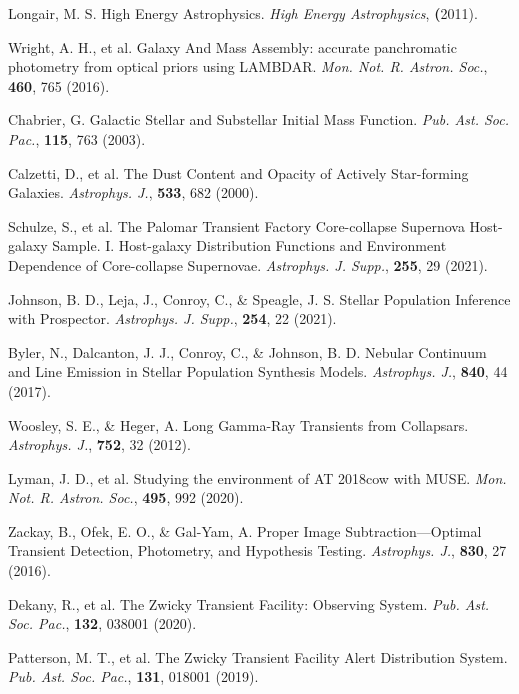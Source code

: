 \documentclass{nature_plusfigure}
\newcommand{\mn}{{Mon. Not. R. Astron. Soc.}}
\newcommand{\mnras}{\mn}
\newcommand{\apj}{{Astrophys. J.}}
\newcommand{\apjs}{{Astrophys. J. Supp.}}
\newcommand{\pasp}{{Pub. Ast. Soc. Pac.}}
\begin{document}
\begin{methods}
\begin{thebibliography}{10}
  Longair, M. S. High Energy Astrophysics. \emph{High Energy Astrophysics}, \textbf (2011). 
 
 
  Wright, A. H., et al. Galaxy And Mass Assembly: accurate panchromatic photometry from optical priors using LAMBDAR. \emph{\mnras}, \textbf{460}, 765 (2016). 
 
   Chabrier, G. Galactic Stellar and Substellar Initial Mass Function. \emph{\pasp}, \textbf{115}, 763 (2003). 

 Calzetti, D., et al. The Dust Content and Opacity of Actively Star-forming Galaxies. \emph{\apj}, \textbf{533}, 682 (2000). 

 Schulze, S., et al. The Palomar Transient Factory Core-collapse Supernova Host-galaxy Sample. I. Host-galaxy Distribution Functions and Environment Dependence of Core-collapse Supernovae. \emph{\apjs}, \textbf{255}, 29 (2021). 

  Johnson, B. D., Leja, J., Conroy, C., \& Speagle, J. S. Stellar Population Inference with Prospector. \emph{\apjs}, \textbf{254}, 22 (2021). 
 
  Byler, N., Dalcanton, J. J., Conroy, C., \& Johnson, B. D. Nebular Continuum and Line Emission in Stellar Population Synthesis Models. \emph{\apj}, \textbf{840}, 44 (2017). 
 
 
  Woosley, S. E., \& Heger, A. Long Gamma-Ray Transients from Collapsars. \emph{\apj}, \textbf{752}, 32 (2012). 
 
  Lyman, J. D., et al. Studying the environment of AT 2018cow with MUSE. \emph{\mnras}, \textbf{495}, 992 (2020). 



 Zackay, B., Ofek, E. O., \& Gal-Yam, A. Proper Image Subtraction—Optimal Transient Detection, Photometry, and Hypothesis Testing. \emph{\apj}, \textbf{830}, 27 (2016). 

 Dekany, R., et al. The Zwicky Transient Facility: Observing System. \emph{\pasp}, \textbf{132}, 038001 (2020). 

 Patterson, M. T., et al. The Zwicky Transient Facility Alert Distribution System. \emph{\pasp}, \textbf{131}, 018001 (2019). 


\end{thebibliography}
\end{methods}
\end{document}
